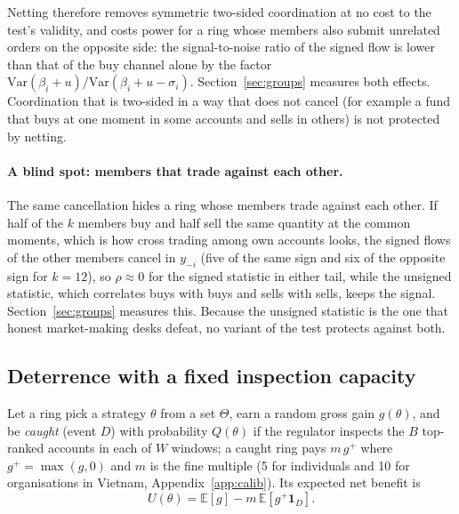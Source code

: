 Netting therefore removes symmetric two-sided coordination at no cost to the test's validity, and costs power for a ring whose members also submit unrelated orders on the opposite side: the signal-to-noise ratio of the signed flow is lower than that of the buy channel alone by the factor $\mathrm{Var}(\beta_i+u)/\mathrm{Var}(\beta_i+u-\sigma_i)$. Section~\ref{sec:groups} measures both effects. Coordination that is two-sided in a way that does not cancel (for example a fund that buys at one moment in some accounts and sells in others) is not protected by netting.

\paragraph{A blind spot: members that trade against each other.} The same cancellation hides a ring whose members trade against each other. If half of the $k$ members buy and half sell the same quantity at the common moments, which is how cross trading among own accounts looks, the signed flows of the other members cancel in $y_{-i}$ (five of the same sign and six of the opposite sign for $k=12$), so $\rho\approx0$ for the signed statistic in either tail, while the unsigned statistic, which correlates buys with buys and sells with sells, keeps the signal. Section~\ref{sec:groups} measures this. Because the unsigned statistic is the one that honest market-making desks defeat, no variant of the test protects against both.

\subsection{Deterrence with a fixed inspection capacity}\label{sec:deter}

Let a ring pick a strategy $\theta$ from a set $\Theta$, earn a random gross gain $g(\theta)$, and be \emph{caught} (event $D$) with probability $Q(\theta)$ if the regulator inspects the $B$ top-ranked accounts in each of $W$ windows; a caught ring pays $m\,g^+$ where $g^+=\max(g,0)$ and $m$ is the fine multiple (5 for individuals and 10 for organisations in Vietnam, Appendix~\ref{app:calib}). Its expected net benefit is
\begin{equation}
U(\theta)=\mathbb E[g]-m\,\mathbb E[g^+\mathbf 1_D].
\label{eq:U}
\end{equation}

